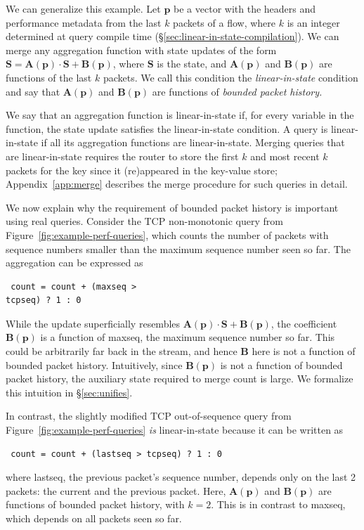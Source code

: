 We can generalize this example. Let $\mathbf{p}$ be a vector with the headers
and performance metadata from the last $k$ packets of a flow, where $k$ is an
integer determined at query compile time
(\S\ref{sec:linear-in-state-compilation}).  We can merge any aggregation
function with state updates of the form $\boldsymbol{S} =
\boldsymbol{A}(\mathbf{p}) \cdot \boldsymbol{S} + \boldsymbol{B}(\mathbf{p})$,
where $\boldsymbol{S}$ is the state, and $\boldsymbol{A}(\mathbf{p})$ and
$\boldsymbol{B}(\mathbf{p})$ are functions of the last $k$ packets. We call
this condition the {\em linear-in-state} condition and say that
$\boldsymbol{A}(\mathbf{p})$ and $\boldsymbol{B}(\mathbf{p})$ are functions of
{\em bounded packet history.}

 We say that an aggregation function is linear-in-state if, for every variable
in the function, the state update satisfies the linear-in-state condition. A
query is linear-in-state if all its aggregation functions are linear-in-state.
Merging queries that are linear-in-state requires the router to store the first
$k$ and most recent $k$ packets for the key since it (re)appeared in the
key-value store; Appendix~\ref{app:merge} describes the merge procedure for
such queries in detail.

We now explain why the requirement of bounded packet history is important using
real queries.  Consider the TCP non-monotonic query from
Figure~\ref{fig:example-perf-queries}, which counts the number of packets with
sequence numbers smaller than the maximum sequence number seen so far. The
aggregation can be expressed as \begin{lstlisting} count = count + (maxseq >
tcpseq) ? 1 : 0 \end{lstlisting} While the update superficially resembles
$\boldsymbol{A}(\mathbf{p}) \cdot \boldsymbol{S} + \boldsymbol{B}(\mathbf{p})$,
the coefficient $\boldsymbol{B}(\mathbf{p})$ is a function of {\ct maxseq}, the
maximum sequence number so far. This could be arbitrarily far back in the
stream, and hence $\boldsymbol{B}$ here is not a function of bounded packet
history. Intuitively, since $\boldsymbol{B}(\mathbf{p})$ is not a function of
bounded packet history, the auxiliary state required to merge {\ct count} is
large. We formalize this intuition in \S\ref{sec:unifies}.

In contrast, the slightly modified TCP out-of-sequence query from
Figure~\ref{fig:example-perf-queries} {\em is} linear-in-state because it can
be written as \begin{lstlisting} count = count + (lastseq > tcpseq) ? 1 : 0
\end{lstlisting} where {\ct lastseq}, the previous packet's sequence number,
depends only on the last 2 packets: the current and the previous packet. Here,
$\boldsymbol{A}(\mathbf{p})$ and $\boldsymbol{B}(\mathbf{p})$ are functions of
bounded packet history, with $k = 2$. This is in contrast to {\ct maxseq},
which depends on all packets seen so far.

